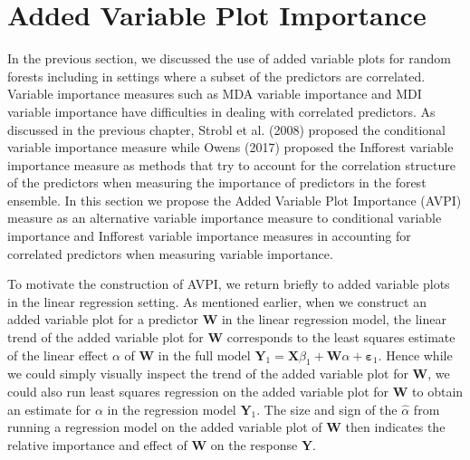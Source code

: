 \documentclass[12pt,twoside]{reedthesis}
\theoremstyle{definition}
\theoremstyle{definition}
\theoremstyle{definition}
\theoremstyle{remark}
\begin{document}
\section{Added Variable Plot
Importance}\label{added-variable-plot-importance-1}

In the previous section, we discussed the use of added variable plots
for random forests including in settings where a subset of the
predictors are correlated. Variable importance measures such as MDA
variable importance and MDI variable importance have difficulties in
dealing with correlated predictors. As discussed in the previous
chapter, Strobl et al. (2008) proposed the conditional variable
importance measure while Owens (2017) proposed the Infforest variable
importance measure as methods that try to account for the correlation
structure of the predictors when measuring the importance of predictors
in the forest ensemble. In this section we propose the Added Variable
Plot Importance (AVPI) measure as an alternative variable importance
measure to conditional variable importance and Infforest variable
importance measures in accounting for correlated predictors when
measuring variable importance.

To motivate the construction of AVPI, we return briefly to added
variable plots in the linear regression setting. As mentioned earlier,
when we construct an added variable plot for a predictor \(\mathbf{W}\)
in the linear regression model, the linear trend of the added variable
plot for \(\mathbf{W}\) corresponds to the least squares estimate of the
linear effect \(\alpha\) of \(\mathbf{W}\) in the full model
\(\mathbf{Y}_1=\mathbf{X}\beta_1+\mathbf{W}\alpha+\mathbf{\varepsilon}_1\).
Hence while we could simply visually inspect the trend of the added
variable plot for \(\mathbf{W}\), we could also run least squares
regression on the added variable plot for \(\mathbf{W}\) to obtain an
estimate for \(\alpha\) in the regression model \(\mathbf{Y}_1\). The
size and sign of the \(\hat{\alpha}\) from running a regression model on
the added variable plot of \(\mathbf{W}\) then indicates the relative
importance and effect of \(\mathbf{W}\) on the response \(\mathbf{Y}\).
\end{document}
